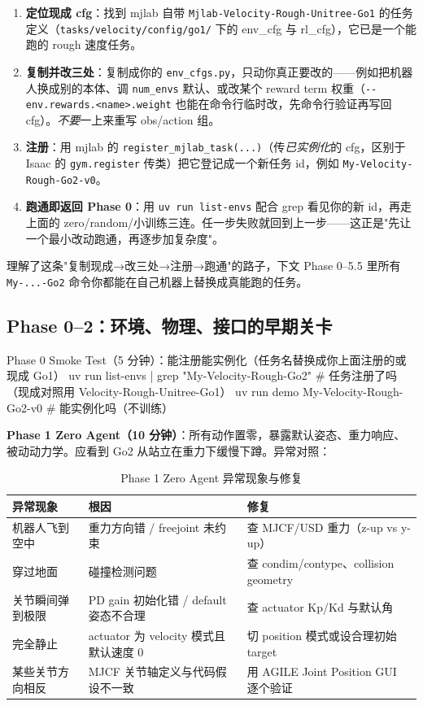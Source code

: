 \begin{enumerate}
  \item \textbf{定位现成 cfg}：找到 mjlab 自带 \verb|Mjlab-Velocity-Rough-Unitree-Go1| 的任务定义（\verb|tasks/velocity/config/go1/| 下的 env\_cfg 与 rl\_cfg），它已是一个能跑的 rough 速度任务。
  \item \textbf{复制并改三处}：复制成你的 \verb|env_cfgs.py|，只动你真正要改的——例如把机器人换成别的本体、调 \verb|num_envs| 默认、或改某个 reward term 权重（\verb|--env.rewards.<name>.weight| 也能在命令行临时改，先命令行验证再写回 cfg）。\emph{不要}一上来重写 obs/action 组。
  \item \textbf{注册}：用 mjlab 的 \verb|register_mjlab_task(...)|（传\emph{已实例化}的 cfg，区别于 Isaac 的 \verb|gym.register| 传类）把它登记成一个新任务 id，例如 \verb|My-Velocity-Rough-Go2-v0|。
  \item \textbf{跑通即返回 Phase 0}：用 \verb!uv run list-envs! 配合 grep 看见你的新 id，再走上面的 zero/random/小训练三连。任一步失败就回到上一步——这正是"先让一个最小改动跑通，再逐步加复杂度"。
\end{enumerate}

理解了这条"复制现成→改三处→注册→跑通"的路子，下文 Phase 0--5.5 里所有 \verb|My-...-Go2| 命令你都能在自己机器上替换成真能跑的任务。

\subsection{Phase 0--2：环境、物理、接口的早期关卡}

\begin{codebox}[bash]{Phase 0 Smoke Test（5 分钟）：能注册能实例化（任务名替换成你上面注册的或现成 Go1）}
uv run list-envs | grep "My-Velocity-Rough-Go2"   # 任务注册了吗（现成对照用 Velocity-Rough-Unitree-Go1）
uv run demo My-Velocity-Rough-Go2-v0              # 能实例化吗（不训练）
\end{codebox}

\textbf{Phase 1 Zero Agent（10 分钟）}：所有动作置零，暴露默认姿态、重力响应、被动动力学。应看到 Go2 从站立在重力下缓慢下蹲。异常对照：

\begin{table}[H]
\centering
\caption{Phase 1 Zero Agent 异常现象与修复}
\label{tab:rlmc-diag-zero}
\begin{tabular}{p{3.6cm}p{4.4cm}p{4.0cm}}
\hline
异常现象 & 根因 & 修复 \\
\hline
机器人飞到空中 & 重力方向错 / freejoint 未约束 & 查 MJCF/USD 重力（z-up vs y-up） \\
穿过地面 & 碰撞检测问题 & 查 condim/contype、collision geometry \\
关节瞬间弹到极限 & PD gain 初始化错 / default 姿态不合理 & 查 actuator Kp/Kd 与默认角 \\
完全静止 & actuator 为 velocity 模式且默认速度 0 & 切 position 模式或设合理初始 target \\
某些关节方向相反 & MJCF 关节轴定义与代码假设不一致 & 用 AGILE Joint Position GUI 逐个验证 \\
\hline
\end{tabular}
\end{table}

